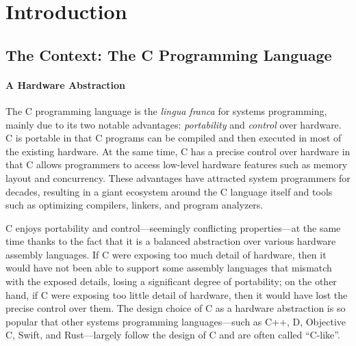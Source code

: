 \section{Introduction}
\label{sec:introduction}

\subsection{The Context: The C Programming Language}

\paragraph{A Hardware Abstraction}

The C programming language is the \emph{lingua franca} for systems programming, mainly due to its
two notable advantages: \emph{portability} and \emph{control} over hardware.  C is portable in that
C programs can be compiled and then executed in most of the existing hardware.  At the same time, C
has a precise control over hardware in that C allows programmers to access low-level hardware
features such as memory layout and concurrency.  These advantages have attracted system programmers
for decades, resulting in a giant ecosystem around the C language itself and tools such as
optimizing compilers, linkers, and program analyzers.

C enjoys portability and control---seemingly conflicting properties---at the same time thanks to the
fact that it is a balanced abstraction over various hardware assembly languages.  If C were exposing
too much detail of hardware, then it would have not been able to support some assembly languages
that mismatch with the exposed details, losing a significant degree of portability; on the other
hand, if C were exposing too little detail of hardware, then it would have lost the precise control
over them.  The design choice of C as a hardware abstraction is so popular that other systems
programming languages---such as C++, D, Objective C, Swift, and Rust---largely follow the design of
C and are often called ``C-like''.




